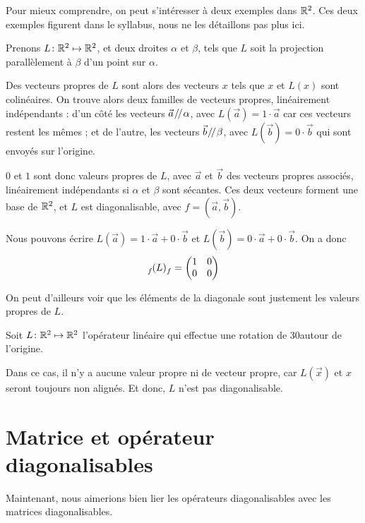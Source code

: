 Pour mieux comprendre, on peut s'intéresser à deux exemples dans $\mathbb{R}^2$. Ces deux exemples figurent dans le syllabus, nous ne les détaillons pas plus ici.

\begin{exemple}
Prenons $L \colon \mathbb{R}^2 \mapsto \mathbb{R}^2$, et deux droites $\alpha$ et $\beta$, tels que $L$ soit la projection parallèlement à $\beta$ d'un point sur $\alpha$.

Des vecteurs propres de $L$ sont alors des vecteurs $x$ tels que $x$ et $L(x)$ sont colinéaires. On trouve alors deux familles de vecteurs propres, linéairement indépendants : d'un côté les vecteurs $\vec{a} \mathbin{\!/\mkern-3mu/\!} \alpha$, avec $L(\vec{a}) = 1 \cdot \vec{a}$ car ces vecteurs restent les mêmes ; et de l'autre, les vecteurs $\vec{b} \mathbin{\!/\mkern-3mu/\!} \beta$, avec $L(\vec{b})=0\cdot \vec{b}$ qui sont envoyés sur l'origine.

$0$ et $1$ sont donc valeurs propres de $L$, avec $\vec{a}$ et $\vec{b}$ des vecteurs propres associés, linéairement indépendants si $\alpha$ et $\beta$ sont sécantes. Ces deux vecteurs forment une base de $\mathbb{R}^2$, et $L$ est diagonalisable, avec $f=(\vec{a}, \vec{b})$.

Nous pouvons écrire $L(\vec{a}) = 1\cdot \vec{a} + 0\cdot\vec{b}$ et $L(\vec{b})=0\cdot\vec{a}+0\cdot\vec{b}$. On a donc
\[ \elfbase{f}{L}{f} = \begin{pmatrix} 1 & 0 \\ 0 & 0 \end{pmatrix} \]

On peut d'ailleurs voir que les éléments de la diagonale sont justement les valeurs propres de $L$.
\end{exemple}

\begin{exemple}
Soit $L \colon \mathbb{R}^2 \mapsto \mathbb{R}^2$ l'opérateur linéaire qui effectue une rotation de 30\degres autour de l'origine.

Dans ce cas, il n'y a aucune valeur propre ni de vecteur propre, car $L(\vec{x})$ et $x$ seront toujours non alignés. Et donc, $L$ n'est pas diagonalisable.
\end{exemple}

\section{Matrice et opérateur diagonalisables}

Maintenant, nous aimerions bien lier les opérateurs diagonalisables avec les matrices diagonalisables.

